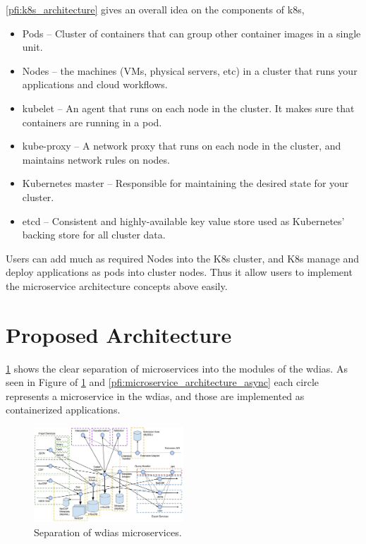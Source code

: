 \documentclass[conference]{IEEEtran}
\newcommand{\db}[1]{\textcolor{blue!40}{#1}}
\begin{document}
\cref{pfi:k8s_architecture} gives an overall idea on the components of \acrshort{k8s},
\begin{itemize}
    \item Pods -- Cluster of containers that can group other container images in a single unit.
    \item Nodes -- the machines (VMs, physical servers, etc) in a cluster that runs your applications and cloud workflows.
    \item kubelet -- An agent that runs on each node in the cluster. It makes sure that containers are running in a pod.
    \item kube-proxy -- A network proxy that runs on each node in the cluster, and maintains network rules on nodes.
    \item Kubernetes master -- Responsible for maintaining the desired state for your cluster.
    \item etcd -- Consistent and highly-available key value store used as Kubernetes’ backing store for all cluster data.
\end{itemize}
Users can add much as required Nodes into the K8s cluster, and K8s manage and
deploy applications as pods into cluster nodes. Thus it allow users to implement the microservice architecture concepts above easily.

\section{\db{Proposed Architecture}}
\label{pse:wdias_architecture}

\cref{pfi:microservice_separation} shows the clear separation of microservices into the modules of the \acrshort{wdias}. As seen in Figure of \cref{pfi:microservice_separation} and \cref{pfi:microservice_architecture_async} each circle represents a microservice in the \acrshort{wdias}, and those are implemented as containerized applications. 

\begin{figure}[htbp]
\centerline{\includegraphics[width=0.5\textwidth]{method/microservice/separation_microservices-v3.jpg}}
\caption{Separation of \acrshort{wdias} microservices.}
\label{pfi:microservice_separation}
\end{figure}
\end{document}
